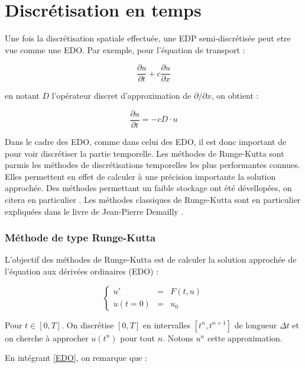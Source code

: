 \documentclass[10pt,a4paper]{amsart}
\begin{document}
%
%

\part{Discrétisation en temps}

Une fois la discrétisation spatiale effectuée, une EDP semi-discrétisée peut etre vue comme une EDO. Par exemple, pour l'équation de transport :

$$\dfrac{\partial u}{\partial t} + c \dfrac{\partial u}{\partial x}$$

en notant $D$ l'opérateur discret d'approximation de $\partial / \partial x$, on obtient :

$$\dfrac{\partial u}{\partial t} = -c D \cdot u$$

Dans le cadre des EDO, comme dans celui des EDO, il est donc important de pour voir discrétiser la partie temporelle. Les méthodes de Runge-Kutta sont parmis les méthodes de discrétisations temporelles les plus performantes connues. Elles permettent en effet de calculer à une précision importante la solution approchée. Des méthodes permettant un faible stockage ont été dévellopées, on citera en particulier \cite{Kennedy Carpenter Lewis}. Les méthodes classiques de Runge-Kutta sont en particulier expliquées dans le livre de Jean-Pierre Demailly \cite{Demailly}.

\section{Méthode de type Runge-Kutta}

L'objectif des méthodes de Runge-Kutta est de calculer la solution approchée de l'équation aux dérivées ordinaires (EDO) :

\begin{equation}\label{EDO}
\left\{
\begin{array}{rcl}
u' & = & F(t,u)\\
u(t=0) & = & u_0
\end{array}
\right.
\end{equation}

Pour $t \in \left[ 0, T \right]$. On discrétise $\left[ 0, T \right]$ en intervalles $\left[ t^n, t^{n+1} \right]$ de longueur $\Delta t$ et on cherche à approcher $u(t^n)$ pour tout $n$. Notons $u^n$ cette approximation.

En intégrant \eqref{EDO}, on remarque que :
\end{document}
